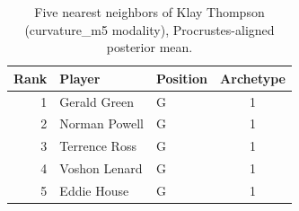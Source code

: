 \begin{table}[htbp]
  \centering\small
  \begin{tabular}{rllc}
    \toprule
    Rank & Player & Position & Archetype \\
    \midrule
    1 & Gerald Green & G & 1 \\
    2 & Norman Powell & G & 1 \\
    3 & Terrence Ross & G & 1 \\
    4 & Voshon Lenard & G & 1 \\
    5 & Eddie House & G & 1 \\
    \bottomrule
  \end{tabular}
  \caption{Five nearest neighbors of Klay Thompson (curvature_m5 modality), Procrustes-aligned posterior mean.}
  \label{tab:Klay_Thompson_neighbors_curvature_m5}
\end{table}

